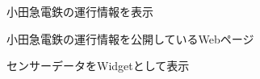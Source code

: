 \begin{figure}[htbp]
  \begin{minipage}{\hsize}
    \begin{center}
    \end{center}
    \caption{小田急電鉄の運行情報を表示}
    \label{fig:odakyu_widget}
  \end{minipage}
\end{figure}

\begin{figure}[htbp]
  \begin{minipage}{\hsize}
    \begin{center}
    \end{center}
    \caption{小田急電鉄の運行情報を公開しているWebページ}
    \label{fig:odakyu_page}
  \end{minipage}
\end{figure}

\begin{figure}[htbp]
  \begin{minipage}{\hsize}
    \begin{center}
    \end{center}
    \caption{センサーデータをWidgetとして表示}
    \label{fig:sensor_widget}
  \end{minipage}
\end{figure}

